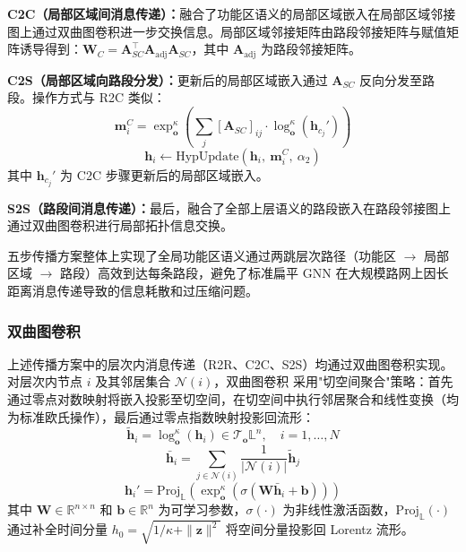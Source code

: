 \textbf{C2C（局部区域间消息传递）：}融合了功能区语义的局部区域嵌入在局部区域邻接图上通过双曲图卷积进一步交换信息。局部区域邻接矩阵由路段邻接矩阵与赋值矩阵诱导得到：$\mathbf{W}_C = \mathbf{A}_{SC}^\top \mathbf{A}_{\text{adj}} \mathbf{A}_{SC}$，其中 $\mathbf{A}_{\text{adj}}$ 为路段邻接矩阵。

\textbf{C2S（局部区域向路段分发）：}更新后的局部区域嵌入通过 $\mathbf{A}_{SC}$ 反向分发至路段。操作方式与 R2C 类似：
\begin{equation}
    \mathbf{m}_{i}^{C} = \exp_{\mathbf{o}}^\kappa\left(\sum_{j} [\mathbf{A}_{SC}]_{ij} \cdot \log_{\mathbf{o}}^\kappa(\mathbf{h}_{c_j}')\right)
\end{equation}
\begin{equation}
    \mathbf{h}_{i} \leftarrow \text{HypUpdate}(\mathbf{h}_{i},\ \mathbf{m}_{i}^{C},\ \alpha_2)
\end{equation}
其中 $\mathbf{h}_{c_j}'$ 为 C2C 步骤更新后的局部区域嵌入。

\textbf{S2S（路段间消息传递）：}最后，融合了全部上层语义的路段嵌入在路段邻接图上通过双曲图卷积进行局部拓扑信息交换。

五步传播方案整体上实现了全局功能区语义通过两跳层次路径（功能区 $\to$ 局部区域 $\to$ 路段）高效到达每条路段，避免了标准扁平 GNN 在大规模路网上因长距离消息传递导致的信息耗散和过压缩问题\cite{topping2022oversquashing}。

\subsubsection{双曲图卷积}

上述传播方案中的层次内消息传递（R2R、C2C、S2S）均通过双曲图卷积实现。对层次内节点 $i$ 及其邻居集合 $\mathcal{N}(i)$，双曲图卷积\cite{chami2019hgcn,liu2019hgnn} 采用"切空间聚合"策略：首先通过零点对数映射将嵌入投影至切空间，在切空间中执行邻居聚合和线性变换（均为标准欧氏操作），最后通过零点指数映射投影回流形：
\begin{equation}
    \tilde{\mathbf{h}}_i = \log_{\mathbf{o}}^{\kappa}(\mathbf{h}_i) \in \mathcal{T}_\mathbf{o}\mathbb{L}^n, \quad i = 1, \ldots, N
\end{equation}
\begin{equation}
    \bar{\mathbf{h}}_i = \sum_{j \in \mathcal{N}(i)} \frac{1}{|\mathcal{N}(i)|} \tilde{\mathbf{h}}_j
\end{equation}
\begin{equation}
    \mathbf{h}_i' = \text{Proj}_{\mathbb{L}}\left(\exp_{\mathbf{o}}^{\kappa}\left(\sigma(\mathbf{W}\bar{\mathbf{h}}_i + \mathbf{b})\right)\right)
    \label{eq:hyp_gcn}
\end{equation}
其中 $\mathbf{W} \in \mathbb{R}^{n \times n}$ 和 $\mathbf{b} \in \mathbb{R}^{n}$ 为可学习参数，$\sigma(\cdot)$ 为非线性激活函数，$\text{Proj}_{\mathbb{L}}(\cdot)$ 通过补全时间分量 $h_0 = \sqrt{1/\kappa + \|\mathbf{z}\|^2}$ 将空间分量投影回 Lorentz 流形。

